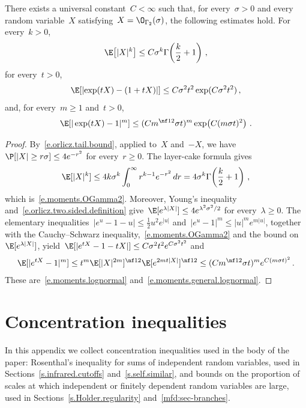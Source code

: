 \documentclass[11pt]{amsart}
\begin{document}
\begin{lemma}
There exists a universal constant~$C<\infty$ such that, for every~$\sigma>0$ and every random variable~$X$ satisfying~$X=\O_{\Gamma_2}(\sigma)$, the following estimates hold. For every~$k>0$,
\begin{equation}
	\E\!\left[|X|^k\right]
	\leq
	C\sigma^k\Gamma\!\left(\frac k2+1\right)\,,
	\label{e.moments.OGamma2}
\end{equation}
for every~$t>0$,
\begin{equation}
	\E\!\left[\left|\exp(tX)-(1+tX)\right|\right]
	\leq
	C\sigma^2t^2\exp(C\sigma^2t^2)\,,
	\label{e.moments.lognormal}
\end{equation}
and, for every~$m\geq1$ and~$t>0$,
\begin{equation}
	\E\!\left[|\exp(tX)-1|^m\right]
	\leq
	(Cm^{\nf12}\sigma t)^m\exp\!\left(C(m\sigma t)^2\right)\,.
	\label{e.moments.general.lognormal}
\end{equation}
\end{lemma}
\begin{proof}
By~\eqref{e.orlicz.tail.bound}, applied to~$X$ and~$-X$, we have~$\P[|X|\geq r\sigma]\leq4e^{-r^2}$ for every~$r\geq0$. The layer-cake formula gives
\begin{equation*}
	\E[|X|^k]
	\leq
	4k\sigma^k\int_0^\infty r^{k-1}e^{-r^2}\,dr
	=
	4\sigma^k\Gamma\!\left(\frac k2+1\right)\,,
\end{equation*}
which is~\eqref{e.moments.OGamma2}. Moreover, Young's inequality and~\eqref{e.orlicz.two.sided.definition} give~$\E[e^{\lambda|X|}]\leq4e^{\lambda^2\sigma^2/2}$ for every~$\lambda\geq0$. The elementary inequalities~$|e^u-1-u|\leq\tfrac12u^2e^{|u|}$ and~$|e^u-1|^m\leq|u|^me^{m|u|}$, together with the Cauchy--Schwarz inequality,~\eqref{e.moments.OGamma2} and the bound on~$\E[e^{\lambda|X|}]$, yield~$\E[|e^{tX}-1-tX|]\leq C\sigma^2t^2e^{C\sigma^2t^2}$ and
\begin{equation*}
	\E[|e^{tX}-1|^m]
	\leq
	t^m\E[|X|^{2m}]^{\nf12}\E[e^{2mt|X|}]^{\nf12}
	\leq
	(Cm^{\nf12}\sigma t)^m e^{C(m\sigma t)^2}\,.
\end{equation*}
These are~\eqref{e.moments.lognormal} and~\eqref{e.moments.general.lognormal}.
\end{proof}

\section{Concentration inequalities}
\label{app.concentration}

In this appendix we collect concentration inequalities used in the body of the paper: Rosenthal's inequality for sums of independent random variables, used in Sections~\ref{s.infrared.cutoffs} and~\ref{s.self.similar}, and bounds on the proportion of scales at which independent or finitely dependent random variables are large, used in Sections~\ref{s.Holder.regularity} and~\ref{mfd:sec-branches}.
\end{document}
